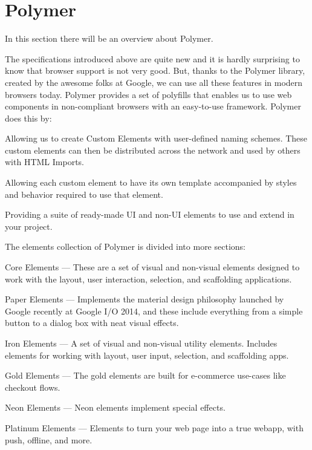 \section{Polymer}
\label{sec:TCH_polymer}

In this section there will be an overview about Polymer.

The specifications introduced above are quite new and it is hardly surprising to know that browser support is not very good. But, thanks to the Polymer library, created by the awesome folks at Google, we can use all these features in modern browsers today. Polymer provides a set of polyfills that enables us to use web components in non-compliant browsers with an easy-to-use framework. Polymer does this by:

Allowing us to create Custom Elements with user-defined naming schemes. These custom elements can then be distributed across the network and used by others with HTML Imports.

Allowing each custom element to have its own template accompanied by styles and behavior required to use that element.

Providing a suite of ready-made UI and non-UI elements to use and extend in your project.

The elements collection of Polymer is divided into more sections:

\item Core Elements — These are a set of visual and non-visual elements designed to work with the layout, user interaction, selection, and scaffolding applications.

\item Paper Elements — Implements the material design philosophy launched by Google recently at Google I/O 2014, and these include everything from a simple button to a dialog box with neat visual effects.

\item Iron Elements — A set of visual and non-visual utility elements. Includes elements for working with layout, user input, selection, and scaffolding apps.

\item Gold Elements — The gold elements are built for e-commerce use-cases like checkout flows.

\item Neon Elements — Neon elements implement special effects.

\item Platinum Elements — Elements to turn your web page into a true webapp, with push, offline, and more.

